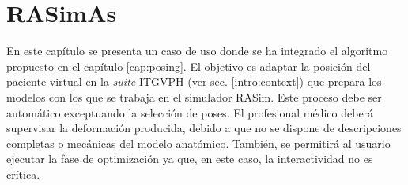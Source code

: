 \chapter{RASimAs} 
\label{cap:rasim}


En este capítulo se presenta un caso de uso donde se ha integrado el algoritmo propuesto en el capítulo \ref{cap:posing}. El objetivo es adaptar la posición del paciente virtual en la \emph{suite} \ac{ITGVPH} (ver sec. \ref{intro:context}) que prepara los modelos con los que se trabaja en el simulador \ac{RASim}. Este proceso debe ser automático exceptuando la selección de poses. El profesional médico deberá supervisar la deformación producida, debido a que no se dispone de descripciones completas o mecánicas del modelo anatómico. También, se permitirá al usuario   ejecutar la fase de optimización ya que, en este caso, la interactividad no es crítica. %







